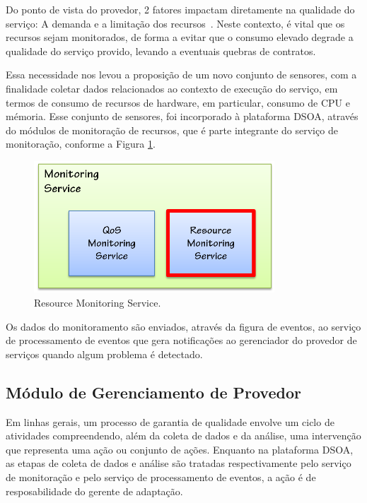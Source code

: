 Do ponto de vista do provedor, 2 fatores impactam diretamente na qualidade do serviço: A demanda e a limitação dos recursos~\cite{ye2011models}. Neste contexto, é vital que os recursos sejam monitorados, de forma a evitar que o consumo elevado degrade a qualidade do serviço provido, levando a eventuais quebras de contratos.

Essa necessidade nos levou a proposição de um novo conjunto de sensores, com a finalidade coletar dados relacionados ao contexto de execução do serviço, em termos de consumo de recursos de hardware, em particular, consumo de CPU e mémoria. Esse conjunto de sensores, foi incorporado à plataforma DSOA, através do módulos de monitoração de recursos, que é parte integrante do serviço de monitoração, conforme a Figura \ref{fig:resc_module}.

\begin{figure}[htp]
\centering
\includegraphics[width=9cm]{chapters/chapter4/monitoring-service.png}
\caption[Resource Monitoring Service]{Resource Monitoring Service.}
\label{fig:resc_module}
\end{figure}


Os dados do monitoramento são enviados, através da figura de eventos, ao serviço de processamento de eventos que gera notificações ao gerenciador do provedor de serviços quando algum problema é detectado.%

\subsection{Módulo de Gerenciamento de Provedor}

Em linhas gerais, um processo de garantia de qualidade envolve um ciclo de atividades compreendendo, além da coleta de dados e da análise, uma intervenção que representa uma ação ou conjunto de ações. Enquanto na plataforma DSOA, as etapas de coleta de dados e análise são tratadas respectivamente pelo serviço de monitoração e pelo serviço de processamento de eventos, a ação é de resposabilidade do gerente de adaptação.

